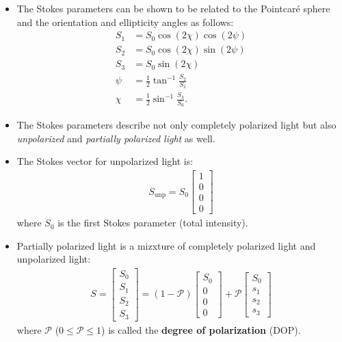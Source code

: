 \documentclass[10pt]{article}
\begin{document}
\begin{itemize}
		\item The Stokes parameters can be shown to be related to the Pointcar\'{e} sphere and the orientation and ellipticity angles as follows:
		\begin{align*}
			S_1 &= S_0 \cos(2\chi) \cos(2\psi) \\ 
			S_2 &= S_0 \cos(2\chi) \sin(2\psi) \\ 
			S_3 &= S_0 \sin(2\chi) \\
			\psi &= \frac{1}{2} \tan^{-1} \frac{S_2}{S_1} \\
			\chi &= \frac{1}{2} \sin^{-1} \frac{S_3}{S_0}.
		\end{align*}

		\item The Stokes parameters describe not only completely polarized light but also \emph{unpolarized} and \emph{partially polarized light} as well.

		\item The Stokes vector for unpolarized light is:
		\begin{align*}
			S_{\mathrm{unp}} = S_0 \begin{bmatrix}
				1 \\ 0 \\ 0 \\ 0
			\end{bmatrix}
		\end{align*}
		where $S_0$ is the first Stokes parameter (total intensity).

		\item Partially polarized light is a mizxture of completely polarized light and unpolarized light:
		\begin{align*}
			S 
			= \begin{bmatrix}
				S_0 \\ S_1 \\ S_2 \\ S_3
			\end{bmatrix}
			= (1 - \mathcal{P}) \begin{bmatrix}
				S_0 \\ 0 \\ 0 \\ 0 
			\end{bmatrix}
			+ \mathcal{P} \begin{bmatrix}
				S_0 \\ s_1 \\ s_2 \\ s_3
			\end{bmatrix}			
		\end{align*}
		where $\mathcal{P}$ ($0 \leq \mathcal{P} \leq 1$) is called the \textbf{degree of polarization} (DOP).


\end{itemize}
\end{document}
